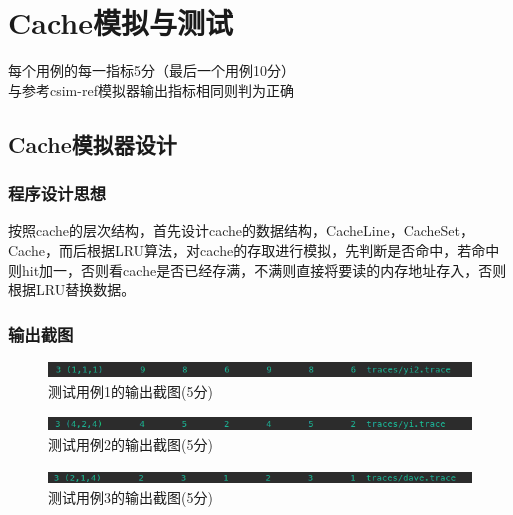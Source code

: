 \section{Cache模拟与测试}
\begin{center}
    每个用例的每一指标5分（最后一个用例10分）\\
    与参考csim-ref模拟器输出指标相同则判为正确
\end{center}

\subsection{Cache模拟器设计}


\subsubsection{程序设计思想}

按照cache的层次结构，首先设计cache的数据结构，CacheLine，CacheSet，Cache，而后根据LRU算法，对cache的存取进行模拟，先判断是否命中，若命中则hit加一，否则看cache是否已经存满，不满则直接将要读的内存地址存入，否则根据LRU替换数据。

\subsubsection{输出截图}

\begin{figure}[H]
    \centering
    \includegraphics[width=0.7\linewidth]{figures/CSim_1}
    \caption{测试用例1的输出截图(5分)}
    \label{fig:csim1}
\end{figure}

\begin{figure}[H]
    \centering
    \includegraphics[width=0.7\linewidth]{figures/CSim_2}
    \caption{测试用例2的输出截图(5分)}
    \label{fig:csim2}
\end{figure}

\begin{figure}[H]
    \centering
    \includegraphics[width=0.7\linewidth]{figures/CSim_3}
    \caption{测试用例3的输出截图(5分)}
    \label{fig:csim3}
\end{figure}

